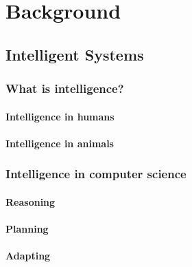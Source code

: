 \documentclass[12pt,a4paper,openright,twoside]{book}
\begin{document}

\part{Background}\label{part:background}


\chapter{Intelligent Systems}\label{ch:intelligent-systems}

\section{What is intelligence?}\label{sec:what-is-intelligence}

\subsection{Intelligence in humans}\label{subsec:intelligence-in-humans}

\subsection{Intelligence in animals}\label{subsec:intelligence-in-animals}

\section{Intelligence in computer science}\label{sec:intelligence-in-computer-science}

\subsection{Reasoning}\label{subsec:reasoning}

\subsection{Planning}\label{subsec:planning}

\subsection{Adapting}\label{subsec:adapting}
\end{document}

